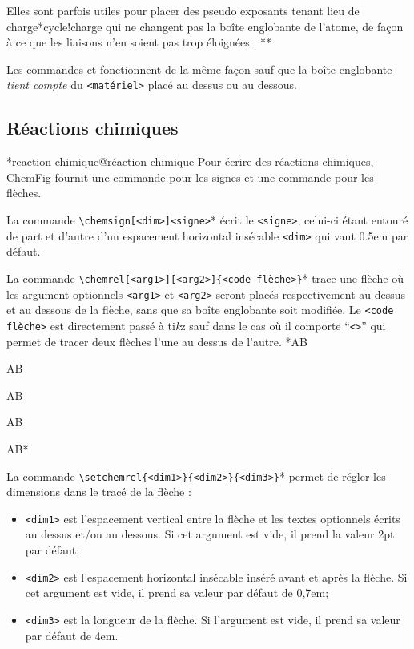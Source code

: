 \documentclass[10pt]{article}
\makeatletter
\newcommand\idx{\@ifstar{\let\print@or@not\@gobble\idx@}{\let\print@or@not\@firstofone\idx@}}
\newcommand\idx@[1]{%
	\ifcat\expandafter\noexpand\@car#1\@nil\relax%
		\expandafter\ifx\@car#1\@nil\protect
			\index{#1}%
			\print@or@not{#1}%
		\else
			\saveexpandmode\expandarg
			\StrSubstitute{\string#1}{\string @}{\@empty\protect\symbol{'100}}[\temp@]%
			\StrGobbleLeft\temp@1[\temp@]%
			\restoreexpandmode
			\expandafter\index\expandafter{\temp@ @\protect\texttt{\protect\textbackslash\temp@}}%
			\print@or@not{\texttt{\string#1}}%
		\fi
	\else
		\index{#1}%
		\print@or@not{#1}%
	\fi
}
\newcommand\make@car@active[1]{%
	\catcode`#1\active
	\begingroup
		\lccode`\~`#1\relax
		\lowercase{\endgroup\def~}%
}
\newif\if@exstar
\newcommand\exemple{%
	\begingroup
	\parskip\z@
	\@makeother\;\@makeother\!\@makeother\?\@makeother\:%
	\@ifstar{\@exstartrue\exemple@}{\@exstarfalse\exemple@}}
\newcommand\exemple@[2][65]{%
	\medbreak\noindent
	\begingroup
		\let\do\@makeother\dospecials
		\make@car@active\ { {}}%
		\make@car@active\^^M{\par\leavevmode}%
		\make@car@active\,{\leavevmode\kern\z@\string,}%
		\make@car@active\-{\leavevmode\kern\z@\string-}%
		\make@car@active\>{\leavevmode\kern\z@\string>}%
		\make@car@active\<{\leavevmode\kern\z@\string<}%
		\exemple@@{#1}{#2}%
}
\newcommand\exemple@@[3]{%
	\def\@tempa##1#3{\exemple@@@{#1}{#2}{##1}}%
	\@tempa
}
\newcommand\exemple@@@[3]{%
	\xdef\the@code{#3}%
	\endgroup
	\if@exstar
		\begingroup
			\fboxrule0.4pt
			\let\breakboxparindent\z@
			\def\bkvz@bottom{\hrule\@height\fboxrule}%
			\let\bkvz@before@breakbox\relax
			\def\bkvz@set@linewidth{\advance\linewidth\dimexpr-2\fboxrule-2\fboxsep}%
			\def\bkvz@left{\vrule\@width\fboxrule\hskip\fboxsep}%
			\def\bkvz@right{\hskip\fboxsep\vrule\@width\fboxrule}%
			\def\bkvz@top{\hbox to \hsize{%
				\vrule\@width\fboxrule\@height\fboxrule
				\leaders\bkvz@bottom\hfill
				\ECFAugie
				\fboxsep\z@
				\colorbox{black}{\kern0.25em\color{white}\footnotesize\lower0.5ex\hbox{\strut#2}\kern0.25em}%
				\leaders\bkvz@bottom\hfill
				\vrule\@width\fboxrule\@height\fboxrule}}%
			\breakbox
				\kern.5ex\relax
				\ttfamily\footnotesize\the@code\par
				\normalfont
				\kern3pt
				\hrule height0.1pt width\linewidth depth0.1pt
				\vskip5pt
				\rightskip0pt plus 1fill
				\everypar{{\color{lightgray}\rlap{\vrule height0.1pt width\linewidth depth0.1pt}}\hskip0pt plus 1fill}%
				\newlinechar`\^^M\everyeof{\noexpand}\scantokens{#3}\par
			\endbreakbox
		\endgroup
	\else
		\vskip0.5ex
		\boxput*(0,1)
			{\fboxsep\z@
			\hbox{\ECFAugie\colorbox{black}{\leavevmode\kern0.25em{\color{white}\footnotesize\strut#2}\kern0.25em}}%
			}%
			{\fboxsep5pt
			\fbox{%
				$\vcenter{\hsize\dimexpr0.#1\linewidth-\fboxsep-\fboxrule\relax
					\kern5pt\parskip0pt \ttfamily\footnotesize\the@code}%
				\vcenter{\kern5pt\hsize\dimexpr\linewidth-0.#1\linewidth-\fboxsep-\fboxrule\relax
					\everypar{{\color{lightgray}\rlap{\vrule height0.1pt width\dimexpr\linewidth-0.#1\linewidth-\fboxsep-\fboxrule depth0.1pt}}}%
					\footnotesize\newlinechar`\^^M\everyeof{\noexpand}\scantokens{#3}}$%
				}%
			}%
	\fi
	\medbreak
	\endgroup
}
\let\do\@makeother\dospecials
\newcommand\CF{{\ECFAugie ChemFig}\xspace}
\newcommand\TIKZ{ti\textit kz\xspace}
\makeatother
\begin{document}
Elles sont parfois utiles pour placer des pseudo exposants tenant lieu de charge\idx*{cycle!charge} qui ne changent pas la boîte englobante de l'atome, de façon à ce que les liaisons n'en soient pas trop éloignées :
\exemple{ion oxonium}**

Les commandes \idx{\Chemabove} et \idx{\Chembelow} fonctionnent de la même façon sauf que la boîte englobante \emph{tient compte} du \verb-<matériel>- placé au dessus ou au dessous.

\subsection{Réactions chimiques}\idx*{reaction chimique@réaction chimique}
Pour écrire des réactions chimiques, \CF fournit une commande pour les signes et une commande pour les flèches.

\label{chemsign}La commande \verb-\chemsign[<dim>]<signe>-\idx*{\chemsign} écrit le \verb-<signe>-, celui-ci étant entouré de part et d'autre d'un espacement horizontal insécable \verb-<dim>- qui vaut 0.5em par défaut.

\label{chemrel}La commande \verb-\chemrel[<arg1>][<arg2>]{<code flèche>}-\idx*{\chemrel} trace une flèche où les argument optionnels \verb-<arg1>- et \verb-<arg2>- seront placés respectivement au dessus et au dessous de la flèche, sans que sa boîte englobante soit modifiée. Le \verb-<code flèche>- est directement passé à \TIKZ sauf dans le cas où il comporte ``\verb/<>/'' qui permet de tracer deux flèches l'une au dessus de l'autre.
\exemple{Types de flèches}*A\chemrel{->}B\par
A\chemrel{<-}B\par
A\chemrel{<->}B\par
A\chemrel{<>}B\par
AB*

\label{setchemrel}La commande \verb-\setchemrel{<dim1>}{<dim2>}{<dim3>}-\idx*{\setchemrel} permet de régler les dimensions dans le tracé de la flèche :
\begin{itemize}
	\item \verb-<dim1>- est l'espacement vertical entre la flèche et les textes optionnels écrits au dessus et/ou au dessous. Si cet argument est vide, il prend la valeur 2pt par défaut;
	\item \verb-<dim2>- est l'espacement horizontal insécable inséré avant et après la flèche. Si cet argument est vide, il prend sa valeur par défaut de 0,7em;
	\item \verb-<dim3>- est la longueur de la flèche. Si l'argument est vide, il prend sa valeur par défaut de 4em.
\end{itemize}
\end{document}
